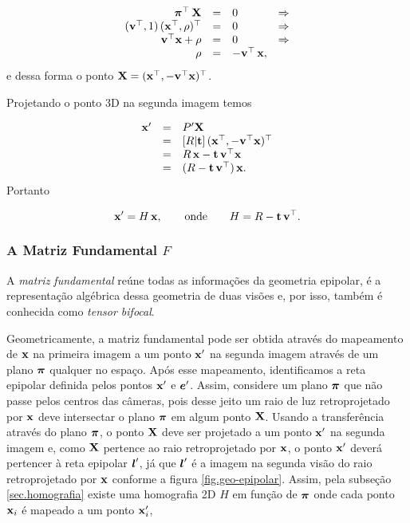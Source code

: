 \begin{equation*}
\begin{array}{rcll}
\boldsymbol{\pi}^\top\,\mathbf{X}&=&0&\Rightarrow\\
({\bf v}^\top,1)\,(\mathbf{x}^\top,\rho)^\top&=&0&\Rightarrow\\
{\bf v}^\top\mathbf{x}+\rho&=&0&\Rightarrow\\
\rho&=&-{\bf v}^\top\,\mathbf{x},&
\end{array}
\end{equation*}
e dessa forma o ponto $\mathbf{X}=(\mathbf{x}^\top,-{\bf v}^\top\mathbf{x})^\top$.

Projetando o ponto 3D na segunda imagem temos

\begin{equation*}
\begin{array}{rcl}
\mathbf{x}'&=&P'\mathbf{X}\\
&=&[R|{\bf t}]\,(\mathbf{x}^\top,-{\bf v}^\top\mathbf{x})^\top\\
&=&R\,\mathbf{x}-{\bf t}\,{\bf v}^\top\mathbf{x}\\
&=&(R-{\bf t}\,{\bf v}^\top)\,\mathbf{x}.
\end{array}
\end{equation*}
Portanto

\begin{equation*}
\mathbf{x}'=H\,\mathbf{x},\qquad\text{onde}\qquad H=R-{\bf t}\,{\bf v}^\top.
\end{equation*}


\subsubsection{A Matriz Fundamental $F$}\label{sec.matriz-F}

A \textit{matriz fundamental} reúne todas as informações da geometria epipolar, é a representação algébrica dessa geometria de duas visões e, por isso, também é conhecida como \textit{tensor bifocal}. 

Geometricamente, a matriz fundamental pode ser obtida através do mapeamento de $\mathbf{x}$ na primeira imagem a um ponto $\mathbf{x}'$ na segunda imagem através de um plano $\boldsymbol{\pi}$ qualquer no espaço. Após esse mapeamento, identificamos a reta epipolar definida pelos pontos $\mathbf{x}'$ e $\boldsymbol{e}'$. Assim, considere um plano $\boldsymbol{\pi}$ que não passe pelos centros das câmeras, pois desse jeito um raio de luz retroprojetado por $\mathbf{x}$ deve intersectar o plano $\boldsymbol{\pi}$ em algum ponto $\mathbf{X}$. Usando a transferência através do plano $\boldsymbol{\pi}$, o ponto $\mathbf{X}$ deve ser projetado a um ponto $\mathbf{x}'$ na segunda imagem e, como $\mathbf{X}$ pertence ao raio retroprojetado por $\mathbf{x}$, o ponto $\mathbf{x}'$ deverá pertencer à reta epipolar $\boldsymbol{l}'$, já que $\boldsymbol{l}'$ é a imagem na segunda visão do raio retroprojetado por $\mathbf{x}$ conforme a figura \ref{fig.geo-epipolar}. Assim, pela subseção \ref{sec.homografia} existe uma homografia 2D $H$ em função de $\boldsymbol{\pi}$ onde cada ponto $\mathbf{x}_i$ é mapeado a um ponto $\mathbf{x}_i'$, 

